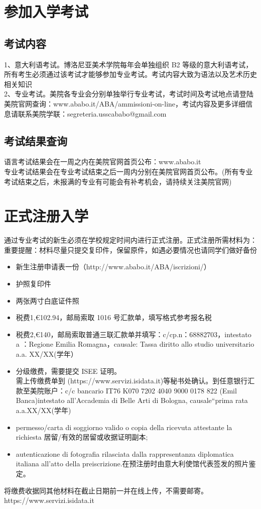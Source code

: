 \section{参加入学考试}

\subsection{考试内容}
1、意大利语考试。博洛尼亚美术学院每年会单独组织 B2 等级的意大利语考试，所有考生必须通过该考试才能够参加专业考试。考试内容大致为语法以及艺术历史相关知识\\
2、专业考试。美院各专业会分别单独举行专业考试，考试时间及考试地点请登陆美院官网查询：www.ababo.it/ABA/ammissioni-on-line，考试内容及更多详细信息请联系美院学联：segreteria.usscababo@gmail.com

\subsection{考试结果查询}
语言考试结果会在一周之内在美院官网首页公布：www.ababo.it\\
专业考试结果会在专业考试结束之后一周内分别在美院官网首页公布。(所有专业考试结束之后，未报满的专业有可能会有补考机会，请持续关注美院官网)\\

\section{正式注册入学}

通过专业考试的新生必须在学校规定时间内进行正式注册。正式注册所需材料为：重要提醒：材料尽量只提交复印件，保留原件，如遇必要情况也请同学们做好备份\\
\begin{itemize}
\item 新生注册申请表一份（http://www.ababo.it/ABA/iscrizioni/）
\item 护照复印件
\item 两张两寸白底证件照
\item 税费1,€102.94，邮局索取 1016 号汇款单，填写格式参考报名税
\item 税费2,€140，邮局索取普通三联汇款单并填写：c/cp.n：68882703，intestato a ：Regione Emilia Romagna，causale: Tassa diritto allo studio universitario a.a. XX/XX(学年）
\item 分级缴费，需要提交 ISEE 证明。\\
需上传缴费单到 (https://www.servizi.isidata.it)等秘书处确认。到任意银行汇款至美院账户：c/c bancario IT76 K070 7202 4040 9000 0178 822 (Emil Banca)intestato all’Accademia di Belle Arti di Bologna, causale“prima rata a.a.XX/XX(学年)
\item permesso/carta di soggiorno valido o copia della ricevuta attestante la richiesta  居留/有效的居留或收据证明副本;
\item autenticazione di fotografia rilasciata dalla rappresentanza diplomatica italiana all’atto della preiscrizione.在预注册时由意大利使馆代表签发的照片鉴定。
\\
\end{itemize}
将缴费收据同其他材料在截止日期前一并在线上传，不需要邮寄。\\
https://www.servizi.isidata.it

